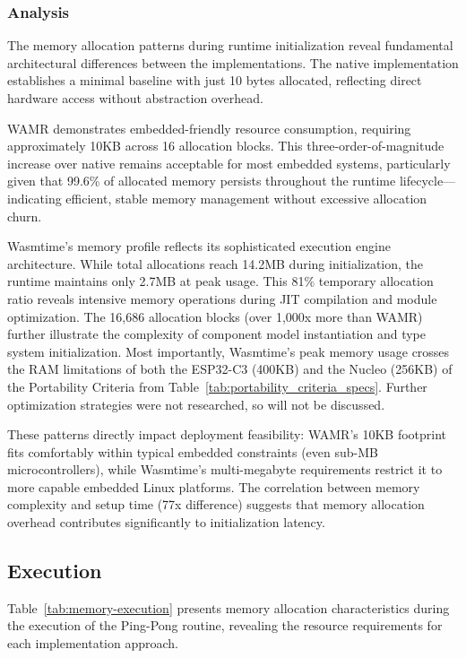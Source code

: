 \subsubsection{Analysis}

The memory allocation patterns during runtime initialization reveal fundamental architectural differences between the implementations. The native implementation establishes a minimal baseline with just 10 bytes allocated, reflecting direct hardware access without abstraction overhead.

WAMR demonstrates embedded-friendly resource consumption, requiring approximately 10KB across 16 allocation blocks. This three-order-of-magnitude increase over native remains acceptable for most embedded systems, particularly given that 99.6\% of allocated memory persists throughout the runtime lifecycle—indicating efficient, stable memory management without excessive allocation churn.

Wasmtime's memory profile reflects its sophisticated execution engine architecture. While total allocations reach 14.2MB during initialization, the runtime maintains only 2.7MB at peak usage. This 81\% temporary allocation ratio reveals intensive memory operations during JIT compilation and module optimization. The 16,686 allocation blocks (over 1,000x more than WAMR) further illustrate the complexity of component model instantiation and type system initialization. Most importantly, Wasmtime's peak memory usage crosses the RAM limitations of both the ESP32-C3 (400KB) and the Nucleo (256KB) of the Portability Criteria from Table~\ref{tab:portability_criteria_specs}. Further optimization strategies were not researched, so will not be discussed.

These patterns directly impact deployment feasibility: WAMR's 10KB footprint fits comfortably within typical embedded constraints (even sub-MB microcontrollers), while Wasmtime's multi-megabyte requirements restrict it to more capable embedded Linux platforms. The correlation between memory complexity and setup time (77x difference) suggests that memory allocation overhead contributes significantly to initialization latency.

\subsection{Execution}

Table~\ref{tab:memory-execution} presents memory allocation characteristics during the execution of the Ping-Pong routine, revealing the resource requirements for each implementation approach.

